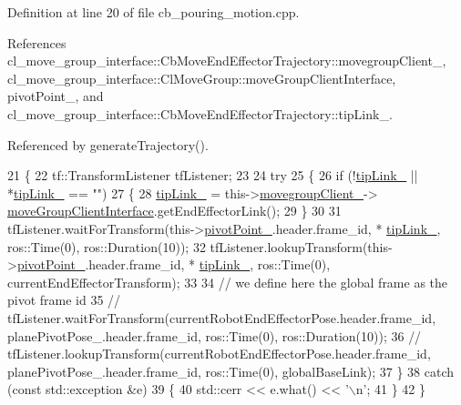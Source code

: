 Definition at line 20 of file cb\+\_\+pouring\+\_\+motion.\+cpp.



References cl\+\_\+move\+\_\+group\+\_\+interface\+::\+Cb\+Move\+End\+Effector\+Trajectory\+::movegroup\+Client\+\_\+, cl\+\_\+move\+\_\+group\+\_\+interface\+::\+Cl\+Move\+Group\+::move\+Group\+Client\+Interface, pivot\+Point\+\_\+, and cl\+\_\+move\+\_\+group\+\_\+interface\+::\+Cb\+Move\+End\+Effector\+Trajectory\+::tip\+Link\+\_\+.



Referenced by generate\+Trajectory().


\begin{DoxyCode}
21     \{
22         tf::TransformListener tfListener;
23 
24         \textcolor{keywordflow}{try}
25         \{
26             \textcolor{keywordflow}{if} (!\hyperlink{classcl__move__group__interface_1_1CbMoveEndEffectorTrajectory_a24c6c30b9b0761a61fa002d947bd3e11}{tipLink\_} || *\hyperlink{classcl__move__group__interface_1_1CbMoveEndEffectorTrajectory_a24c6c30b9b0761a61fa002d947bd3e11}{tipLink\_} == \textcolor{stringliteral}{""})
27             \{
28                 \hyperlink{classcl__move__group__interface_1_1CbMoveEndEffectorTrajectory_a24c6c30b9b0761a61fa002d947bd3e11}{tipLink\_} = this->\hyperlink{classcl__move__group__interface_1_1CbMoveEndEffectorTrajectory_aea650d3e7836125b32be97392b71a7f3}{movegroupClient\_}->
      \hyperlink{classcl__move__group__interface_1_1ClMoveGroup_a92922ea689e4e1b7b91512c56629c95b}{moveGroupClientInterface}.getEndEffectorLink();
29             \}
30 
31             tfListener.waitForTransform(this->\hyperlink{classcl__move__group__interface_1_1CbCircularPouringMotion_a4c100d8ba3e57f7ddfb614017d115fca}{pivotPoint\_}.header.frame\_id, *
      \hyperlink{classcl__move__group__interface_1_1CbMoveEndEffectorTrajectory_a24c6c30b9b0761a61fa002d947bd3e11}{tipLink\_}, ros::Time(0), ros::Duration(10));
32             tfListener.lookupTransform(this->\hyperlink{classcl__move__group__interface_1_1CbCircularPouringMotion_a4c100d8ba3e57f7ddfb614017d115fca}{pivotPoint\_}.header.frame\_id, *
      \hyperlink{classcl__move__group__interface_1_1CbMoveEndEffectorTrajectory_a24c6c30b9b0761a61fa002d947bd3e11}{tipLink\_}, ros::Time(0), currentEndEffectorTransform);
33 
34             \textcolor{comment}{// we define here the global frame as the pivot frame id}
35             \textcolor{comment}{// tfListener.waitForTransform(currentRobotEndEffectorPose.header.frame\_id,
       planePivotPose\_.header.frame\_id, ros::Time(0), ros::Duration(10));}
36             \textcolor{comment}{// tfListener.lookupTransform(currentRobotEndEffectorPose.header.frame\_id,
       planePivotPose\_.header.frame\_id, ros::Time(0), globalBaseLink);}
37         \}
38         \textcolor{keywordflow}{catch} (\textcolor{keyword}{const} std::exception &e)
39         \{
40             std::cerr << e.what() << \textcolor{charliteral}{'\(\backslash\)n'};
41         \}
42     \}
\end{DoxyCode}
